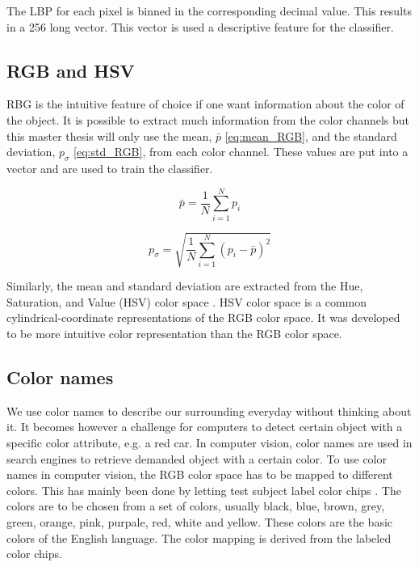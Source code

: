 The LBP for each pixel is binned in the corresponding decimal value. This results in a 256 long vector. This vector is used a descriptive feature for the classifier. 

\subsection{RGB and HSV} \label{subsection:RGB_HSV}

RBG is the intuitive feature of choice if one want information about the color of the object. It is possible to extract much information from the color channels but this master thesis will only use the mean, $\bar{p}$ \cref{eq:mean_RGB}, and the standard deviation, $p_{\sigma}$ \cref{eq:std_RGB}, from each color channel. These values are put into a vector and are used to train the classifier.  

\begin{equation} \label{eq:mean_RGB}
\bar{p} = \frac{1}{N}\sum_{i = 1}^{N} p_i
\end{equation}

\begin{equation} \label{eq:std_RGB}
p_{\sigma} = \sqrt{\frac{1}{N}\sum_{i = 1}^{N}(p_i - \bar{p})^2}
\end{equation}

Similarly, the mean and standard deviation are extracted from the Hue, Saturation, and Value (HSV) color space \cite{hsv_color}. HSV color space is a common cylindrical-coordinate representations of the RGB color space. It was developed to be more intuitive color representation than the RGB color space.  

\subsection{Color names} \label{subsection:Color}

We use color names to describe our surrounding everyday without thinking about it. It becomes however a challenge for computers to detect certain object with a specific color attribute, e.g. a red car. In computer vision, color names are used in search engines to retrieve demanded object with a certain color. To use color names in computer vision, the RGB color space has to be mapped to different colors. This has mainly been done by letting test subject label color chips \cite{griffin2006optimality}. The colors are to be chosen from a set of colors, usually black, blue, brown, grey, green, orange, pink, purpale, red, white and yellow. These colors are the basic colors of the English language. The color mapping is derived from the labeled color chips. 

